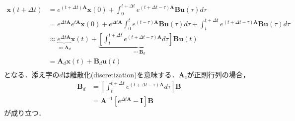 \begin{align}
\mathbf{x}(t+\Delta t)&=e^{(t+\Delta t)\mathbf{A}}\mathbf{x}(0)+\int_0^{t+\Delta t} e^{(t+\Delta t-\tau)\mathbf{A}}\mathbf{B}\mathbf{u}(\tau) d\tau\\
&=e^{\Delta t\mathbf{A}}e^{t\mathbf{A}}\mathbf{x}(0)+e^{\Delta t\mathbf{A}}\int_0^{t} e^{(t-\tau)\mathbf{A}}\mathbf{B}\mathbf{u}(\tau) d\tau + \int_t^{t+\Delta t} e^{(t+\Delta t-\tau)\mathbf{A}}\mathbf{B}\mathbf{u}(\tau) d\tau\\
&\approx \underbrace{e^{\Delta t\mathbf{A}}}_{\eqqcolon  \mathbf{A}_d}\mathbf{x}(t)+\underbrace{\left[\int_t^{t+\Delta t} e^{(t+\Delta t-\tau)\mathbf{A}} d\tau\right] \mathbf{B}}_{\eqqcolon  \mathbf{B}_d}\mathbf{u}(t)\\
&=\mathbf{A}_d\mathbf{x}(t)+\mathbf{B}_d\mathbf{u}(t)\\
\end{align}
となる．添え字の$d$は離散化(discretization)を意味する．$\mathbf{A}_c$が正則行列の場合，
\begin{align}
\mathbf{B}_d &= \left[\int_t^{t+\Delta t} e^{(t+\Delta t-\tau)\mathbf{A}} d\tau\right] \mathbf{B}\\
&=\mathbf{A}^{-1}\left[e^{\Delta t \mathbf{A}}-\mathbf{I}\right]\mathbf{B}
\end{align}
が成り立つ．
